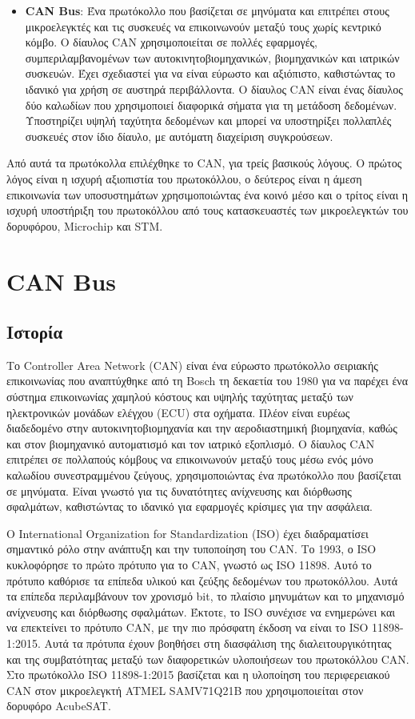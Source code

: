 \documentclass[a4paper,nobib,justified]{tufte-book}
\begin{document}
\begin{itemize}
	\item \textbf{CAN Bus}: Ένα πρωτόκολλο που βασίζεται σε μηνύματα και επιτρέπει στους μικροελεγκτές και τις συσκευές να επικοινωνούν μεταξύ τους χωρίς κεντρικό κόμβο. Ο δίαυλος CAN χρησιμοποιείται σε πολλές εφαρμογές, συμπεριλαμβανομένων των αυτοκινητοβιομηχανικών, βιομηχανικών και ιατρικών συσκευών. Έχει σχεδιαστεί για να είναι εύρωστο και αξιόπιστο, καθιστώντας το ιδανικό για χρήση σε αυστηρά περιβάλλοντα. Ο δίαυλος CAN είναι ένας δίαυλος δύο καλωδίων που χρησιμοποιεί διαφορικά σήματα για τη μετάδοση δεδομένων. Υποστηρίζει υψηλή ταχύτητα δεδομένων και μπορεί να υποστηρίξει πολλαπλές συσκευές στον ίδιο δίαυλο, με αυτόματη διαχείριση συγκρούσεων. 
\end{itemize}

Από αυτά τα πρωτόκολλα επιλέχθηκε το \acs{CAN}, για τρείς βασικούς λόγους. Ο πρώτος λόγος είναι η ισχυρή αξιοπιστία του πρωτοκόλλου, ο δεύτερος είναι η άμεση επικοινωνία των υποσυστημάτων χρησιμοποιώντας ένα κοινό μέσο και ο τρίτος είναι η ισχυρή υποστήριξη του πρωτοκόλλου από τους κατασκευαστές των μικροελεγκτών του δορυφόρου, Microchip και STM.

\section{CAN Bus}
\subsection{Ιστορία}
Το Controller Area Network (CAN) είναι ένα εύρωστο πρωτόκολλο σειριακής επικοινωνίας που αναπτύχθηκε από τη Bosch τη δεκαετία του 1980 για να παρέχει ένα σύστημα επικοινωνίας χαμηλού κόστους και υψηλής ταχύτητας μεταξύ των ηλεκτρονικών μονάδων ελέγχου (ECU) στα οχήματα. Πλέον είναι ευρέως διαδεδομένο στην αυτοκινητοβιομηχανία και την αεροδιαστημική βιομηχανία, καθώς και στον βιομηχανικό αυτοματισμό και τον ιατρικό εξοπλισμό. Ο δίαυλος CAN επιτρέπει σε πολλαπούς κόμβους να επικοινωνούν μεταξύ τους μέσω ενός μόνο καλωδίου συνεστραμμένου ζεύγους, χρησιμοποιώντας ένα πρωτόκολλο που βασίζεται σε μηνύματα. Είναι γνωστό για τις δυνατότητες ανίχνευσης και διόρθωσης σφαλμάτων, καθιστώντας το ιδανικό για εφαρμογές κρίσιμες για την ασφάλεια.

Ο International Organization for Standardization (ISO) έχει διαδραματίσει σημαντικό ρόλο στην ανάπτυξη και την τυποποίηση του CAN. Το 1993, ο ISO κυκλοφόρησε το πρώτο πρότυπο για το CAN, γνωστό ως ISO 11898. Αυτό το πρότυπο καθόρισε τα επίπεδα υλικού και ζεύξης δεδομένων του πρωτοκόλλου. Αυτά τα επίπεδα περιλαμβάνουν τον χρονισμό bit, το πλαίσιο μηνυμάτων και το μηχανισμό ανίχνευσης και διόρθωσης σφαλμάτων. Έκτοτε, το ISO συνέχισε να ενημερώνει και να επεκτείνει το πρότυπο CAN, με την πιο πρόσφατη έκδοση να είναι το ISO 11898-1:2015. Αυτά τα πρότυπα έχουν βοηθήσει στη διασφάλιση της διαλειτουργικότητας και της συμβατότητας μεταξύ των διαφορετικών υλοποιήσεων του πρωτοκόλλου CAN. Στο πρωτόκολλο ISO 11898-1:2015 βασίζεται και η υλοποίηση του περιφερειακού CAN στον μικροελεγκτή ATMEL SAMV71Q21B που χρησιμοποιείται στον δορυφόρο AcubeSAT.
\end{document}
